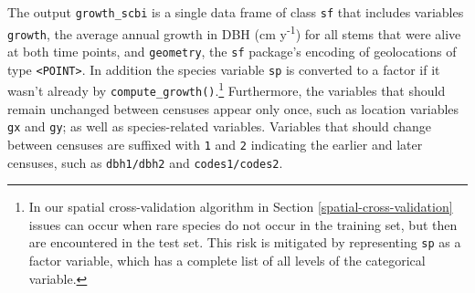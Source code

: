 \documentclass[12pt]{article}
\newenvironment{Shaded}{\begin{snugshade}}{\end{snugshade}}
\newcommand{\CommentTok}[1]{\textcolor[rgb]{0.56,0.35,0.01}{\textit{#1}}}
\newcommand{\DataTypeTok}[1]{\textcolor[rgb]{0.13,0.29,0.53}{#1}}
\newcommand{\DecValTok}[1]{\textcolor[rgb]{0.00,0.00,0.81}{#1}}
\newcommand{\KeywordTok}[1]{\textcolor[rgb]{0.13,0.29,0.53}{\textbf{#1}}}
\newcommand{\NormalTok}[1]{#1}
\newcommand{\OperatorTok}[1]{\textcolor[rgb]{0.81,0.36,0.00}{\textbf{#1}}}
\newcommand{\StringTok}[1]{\textcolor[rgb]{0.31,0.60,0.02}{#1}}
\begin{document}
\begin{Shaded}
\end{Shaded}

The output \texttt{growth\_scbi} is a single data frame of class
\texttt{sf} that includes variables \texttt{growth}, the average annual
growth in DBH (cm y\textsuperscript{-1}) for all stems that were alive
at both time points, and \texttt{geometry}, the \texttt{sf} package's
encoding of geolocations of type
\texttt{\textless{}POINT\textgreater{}}. In addition the species
variable \texttt{sp} is converted to a factor if it wasn't already by
\texttt{compute\_growth()}.\footnote{In our spatial cross-validation
  algorithm in Section \ref{spatial-cross-validation} issues can occur
  when rare species do not occur in the training set, but then are
  encountered in the test set. This risk is mitigated by representing
  \texttt{sp} as a factor variable, which has a complete list of all
  levels of the categorical variable.} Furthermore, the variables that
should remain unchanged between censuses appear only once, such as
location variables \texttt{gx} and \texttt{gy}; as well as
species-related variables. Variables that should change between censuses
are suffixed with \texttt{1} and \texttt{2} indicating the earlier and
later censuses, such as \texttt{dbh1/dbh2} and \texttt{codes1/codes2}.
\end{document}
